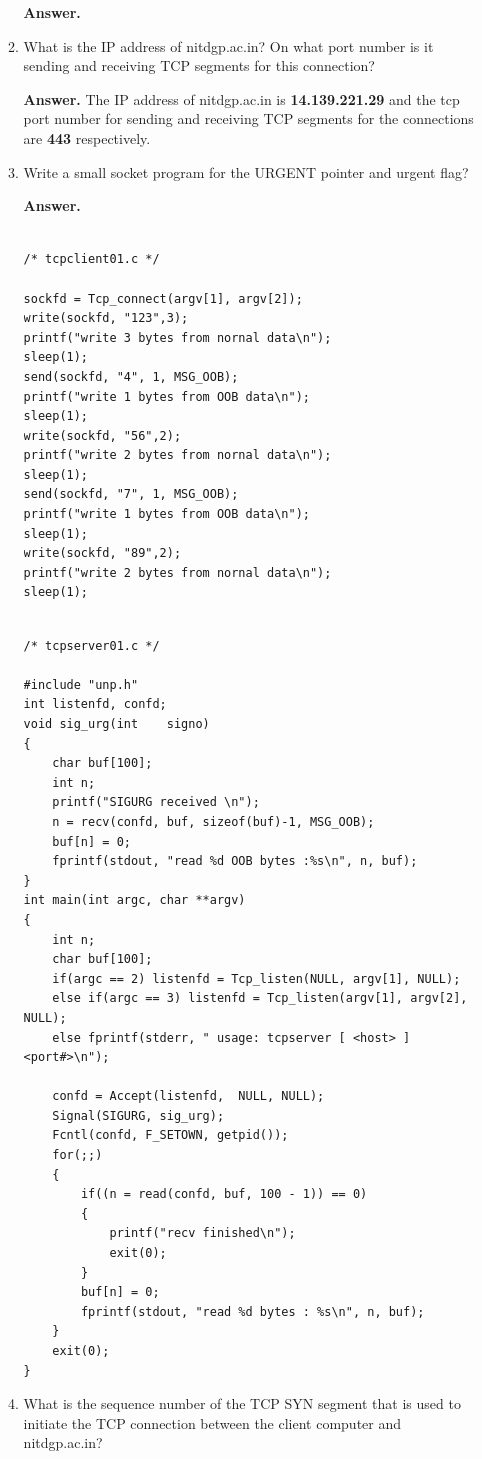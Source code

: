 \documentclass{article}
\begin{document}
\begin{enumerate}
\begin{enumerate}
\textbf{Answer.}

\item What is the IP address of nitdgp.ac.in? On what port number is it sending and receiving
TCP segments for this connection?

\textbf{Answer.} The IP address of nitdgp.ac.in is \textbf{14.139.221.29} and the tcp port number for sending and receiving TCP segments for the connections are \textbf{443} respectively.

\item Write a small socket program for the URGENT pointer and urgent flag?

\textbf{Answer.}

\begin{lstlisting}

/* tcpclient01.c */ 

sockfd = Tcp_connect(argv[1], argv[2]);
write(sockfd, "123",3);
printf("write 3	bytes from nornal data\n");
sleep(1);
send(sockfd, "4", 1, MSG_OOB);
printf("write 1	bytes from OOB data\n");
sleep(1);
write(sockfd, "56",2);
printf("write 2 bytes from nornal data\n");
sleep(1);
send(sockfd, "7", 1, MSG_OOB);
printf("write 1 bytes from OOB data\n");
sleep(1);
write(sockfd, "89",2);
printf("write 2 bytes from nornal data\n");
sleep(1);

\end{lstlisting}

\begin{lstlisting}

/* tcpserver01.c */ 

#include "unp.h"
int listenfd, confd;
void sig_urg(int	signo)
{
	char buf[100];
	int	n;
	printf("SIGURG received \n");
	n = recv(confd, buf, sizeof(buf)-1, MSG_OOB);
	buf[n] = 0;
	fprintf(stdout, "read %d OOB bytes :%s\n", n, buf);
}
int	main(int argc, char	**argv)
{
	int	n;
	char buf[100];
	if(argc	== 2) listenfd = Tcp_listen(NULL, argv[1], NULL);
	else if(argc == 3) listenfd = Tcp_listen(argv[1], argv[2], NULL);
	else fprintf(stderr, " usage: tcpserver [ <host> ] <port#>\n");
	
	confd = Accept(listenfd,  NULL, NULL);
	Signal(SIGURG, sig_urg);
	Fcntl(confd, F_SETOWN, getpid());
	for(;;)
	{
		if((n = read(confd, buf, 100 - 1)) == 0)
		{
			printf("recv finished\n");
			exit(0);
		}
		buf[n] = 0;
		fprintf(stdout, "read %d bytes : %s\n", n, buf);
	}
	exit(0);
}

\end{lstlisting}

\item What is the sequence number of the TCP SYN segment that is used to initiate the TCP
connection between the client computer and nitdgp.ac.in?


\end{enumerate}
\end{enumerate}
\end{document}
